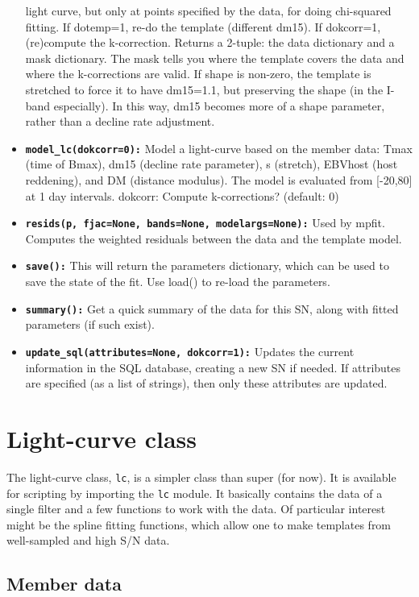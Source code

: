 \documentclass[12pt]{article}
\begin{document}
\begin{itemize}
light curve, but only at points specified by the data, for doing chi-squared
fitting. If dotemp=1, re-do the template (different dm15). If dokcorr=1,
(re)compute the k-correction. Returns a 2-tuple: the data dictionary
and a mask dictionary. The mask tells you where the template covers
the data and where the k-corrections are valid. If shape is non-zero,
the template is stretched to force it to have dm15=1.1, but preserving
the shape (in the I-band especially). In this way, dm15 becomes more
of a shape parameter, rather than a decline rate adjustment. 
\item \texttt{\textbf{model\_lc(dokcorr=0):}} Model a light-curve based
on the member data: Tmax (time of Bmax), dm15 (decline rate parameter),
s (stretch), EBVhost (host reddening), and DM (distance modulus).
The model is evaluated from {[}-20,80] at 1 day intervals. dokcorr:
Compute k-corrections? (default: 0) 
\item \texttt{\textbf{resids(p, fjac=None, bands=None, modelargs=None):}}
Used by mpfit. Computes the weighted residuals between the data and
the template model. 
\item \texttt{\textbf{save():}} This will return the parameters dictionary,
which can be used to save the state of the fit. Use load() to re-load
the parameters. 
\item \texttt{\textbf{summary():}} Get a quick summary of the data for this
SN, along with fitted parameters (if such exist). 
\item \texttt{\textbf{update\_sql(attributes=None, dokcorr=1):}} Updates
the current information in the SQL database, creating a new SN if
needed. If attributes are specified (as a list of strings), then only
these attributes are updated. 
\end{itemize}

\section{Light-curve class\label{sec:Lightcurve-class}}

The light-curve class, \texttt{lc}, is a simpler class than super
(for now). It is available for scripting by importing the \texttt{lc}
module. It basically contains the data of a single filter and a few
functions to work with the data. Of particular interest might be the
spline fitting functions, which allow one to make templates from well-sampled
and high S/N data. 


\subsection{Member data}
\end{document}
